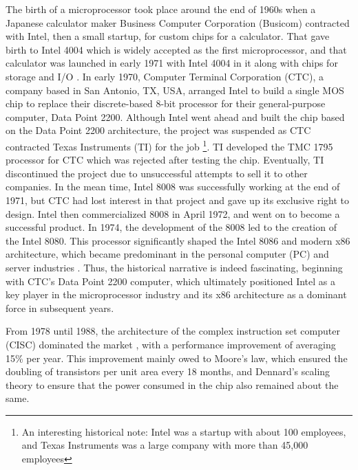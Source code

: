 \documentclass[journal]{IEEEtran}
\begin{document}
The birth of a microprocessor took place around the end of 1960s when a Japanese calculator maker Business Computer Corporation (Busicom) contracted with Intel, then a small startup, for custom chips for a calculator. That gave birth to Intel 4004 which is widely accepted as the first microprocessor, and that calculator was launched in early 1971 with Intel 4004 in it along with chips for storage and I/O \cite{faggin_history_1996}. In early 1970, Computer Terminal Corporation (CTC), a company based in San Antonio, TX, USA, arranged Intel to build a single MOS chip to replace their discrete-based 8-bit processor for their general-purpose computer, Data Point 2200. Although Intel went ahead and built the chip based on the Data Point 2200 architecture, the project was suspended as CTC contracted Texas Instruments (TI) for the job \footnote{An interesting historical note: Intel was a startup with about 100 employees, and Texas Instruments was a large company with more than 45,000 employees}. TI developed the TMC 1795 processor for CTC which was rejected after testing the chip. Eventually, TI discontinued the project due to unsuccessful attempts to sell it to other companies. In the mean time, Intel 8008 was successfully working at the end of 1971, but CTC had lost interest in that project and gave up its exclusive right to design. Intel then commercialized 8008 in April 1972, and went on to become a successful product. In 1974, the development of the 8008 led to the creation of the Intel 8080. This processor significantly shaped the Intel 8086 and modern x86 architecture, which became predominant in the personal computer (PC) and server industries \cite{noauthor_intel_2024}. Thus, the historical narrative is indeed fascinating, beginning with CTC's Data Point 2200 computer, which ultimately positioned Intel as a key player in the microprocessor industry and its x86 architecture as a dominant force in subsequent years.

From 1978 until 1988, the architecture of the complex instruction set computer (CISC) dominated the market \cite{blem_power_2013}, with a performance improvement of averaging 15\% per year. This improvement mainly owed to Moore's law, which ensured the doubling of transistors per unit area every 18 months, and Dennard's scaling theory to ensure that the power consumed in the chip also remained about the same.
\end{document}
